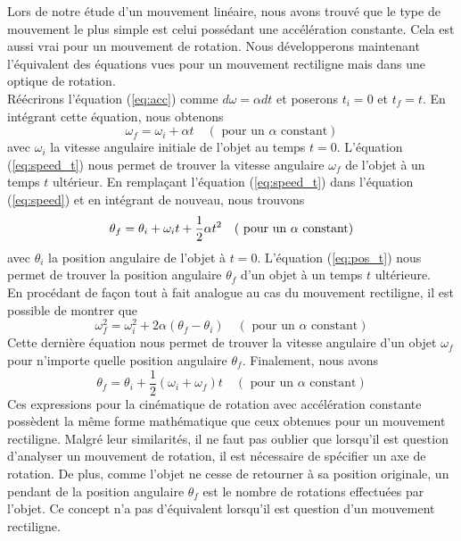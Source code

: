 \documentclass[titlepage,oneside,a4paper,11pt]{book} %
\begin{document}
Lors de notre étude d'un mouvement linéaire, nous avons trouvé que le type de mouvement le plus simple est celui possédant une accélération constante. Cela est aussi vrai pour un mouvement de rotation. Nous développerons maintenant l'équivalent des équations vues pour un mouvement rectiligne mais dans une optique de rotation.\\

Réécrirons l'équation (\ref{eq:acc}) comme $d\omega = \alpha dt$ et poserons $t_i=0$ et $t_f=t$. En intégrant cette équation, nous obtenons
\begin{equation}
\omega_{f}=\omega_{i}+\alpha t \quad(\text { pour un } \alpha \text { constant})
\label{eq:speed_t}
\end{equation}
avec $\omega_i$ la vitesse angulaire initiale de l'objet au temps $t=0$. L'équation (\ref{eq:speed_t}) nous permet de trouver la vitesse angulaire $\omega_f$ de l'objet à un temps $t$ ultérieur. En remplaçant l'équation (\ref{eq:speed_t}) dans l'équation (\ref{eq:speed}) et en intégrant de nouveau, nous trouvons
\begin{equation}
\theta_{f}=\theta_{i}+\omega_{i} t+\frac{1}{2} \alpha t^{2} \\ \quad(\text { pour un } \alpha \text { constant})
\label{eq:pos_t}
\end{equation}
avec $\theta_i$ la position angulaire de l'objet à $t=0$. L'équation (\ref{eq:pos_t}) nous permet de trouver la position angulaire $\theta_f$ d'un objet à un temps $t$ ultérieure.\\

En procédant de façon tout à fait analogue au cas du mouvement rectiligne, il est possible de montrer que
\begin{equation}
\omega_{f}^{2}=\omega_{i}^{2}+2 \alpha\left(\theta_{f}-\theta_{i}\right) \quad(\text { pour un } \alpha \text { constant})
\end{equation}
Cette dernière équation nous permet de trouver la vitesse angulaire d'un objet $\omega_f$ pour n'importe quelle position angulaire $\theta_f$. Finalement, nous avons
\begin{equation}
\theta_{f}=\theta_{i}+\frac{1}{2}\left(\omega_{i}+\omega_{f}\right) t \quad(\text { pour un } \alpha \text { constant})
\end{equation}
Ces expressions pour la cinématique de rotation avec accélération constante possèdent la même forme mathématique que ceux obtenues pour un mouvement rectiligne. Malgré leur similarités, il ne faut pas oublier que lorsqu'il est question d'analyser un mouvement de rotation, il est nécessaire de spécifier un axe de rotation. De plus, comme l'objet ne cesse de retourner à sa position originale, un pendant de la position angulaire $\theta_f$ est le nombre de rotations effectuées par l'objet. Ce concept n'a pas d'équivalent lorsqu'il est question d'un mouvement rectiligne.\\
\end{document}
